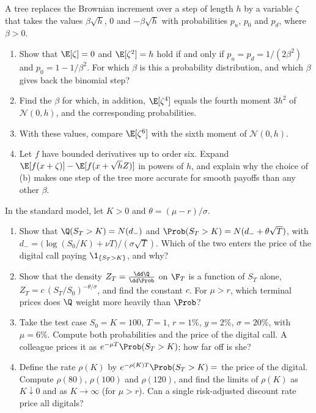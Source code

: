 
\begin{exercise}\label{ex:sm-trinomial}
\easy A tree replaces the Brownian increment over a step of length $h$ by a variable $\zeta$ that
takes the values $\beta\sqrt h$, $0$ and $-\beta\sqrt h$ with probabilities $p_u$, $p_0$ and $p_d$,
where $\beta>0$.
\begin{enumerate}[label=(\alph*)]
  \item Show that $\E[\zeta]=0$ and $\E[\zeta^2]=h$ hold if and only if $p_u=p_d=1/(2\beta^2)$ and
    $p_0=1-1/\beta^2$. For which $\beta$ is this a probability distribution, and which $\beta$
    gives back the binomial step?
  \item Find the $\beta$ for which, in addition, $\E[\zeta^4]$ equals the fourth moment $3h^2$ of
    $\mathcal N(0,h)$, and the corresponding probabilities.
  \item With these values, compare $\E[\zeta^6]$ with the sixth moment of $\mathcal N(0,h)$.
  \item Let $f$ have bounded derivatives up to order six. Expand $\E[f(x+\zeta)]-\E[f(x+\sqrt hZ)]$
    in powers of $h$, and explain why the choice of (b) makes one step of the tree more accurate
    for smooth payoffs than any other $\beta$.
\end{enumerate}
\end{exercise}

\begin{exercise}\label{ex:sm-two-measures}
\easy In the standard model, let $K>0$ and $\theta=(\mu-r)/\sigma$.
\begin{enumerate}[label=(\alph*)]
  \item Show that $\Q(S_T>K)=N(d_-)$ and $\Prob(S_T>K)=N(d_-+\theta\sqrt T)$, with
    $d_-=\big(\log(S_0/K)+\nu T\big)/(\sigma\sqrt T)$. Which of the two enters the price of the
    digital call paying $\1_{\{S_T>K\}}$, and why?
  \item Show that the density $Z_T=\frac{\dd\Q}{\dd\Prob}$ on $\F_T$ is a function of $S_T$ alone,
    $Z_T=c\,(S_T/S_0)^{-\theta/\sigma}$, and find the constant $c$. For $\mu>r$, which terminal
    prices does $\Q$ weight more heavily than $\Prob$?
  \item Take the test case $S_0=K=100$, $T=1$, $r=1\%$, $y=2\%$, $\sigma=20\%$, with $\mu=6\%$.
    Compute both probabilities and the price of the digital call. A colleague prices it as
    $e^{-\mu T}\Prob(S_T>K)$; how far off is she?
  \item Define the rate $\rho(K)$ by $e^{-\rho(K)T}\Prob(S_T>K)=$ the price of the digital. Compute
    $\rho(80)$, $\rho(100)$ and $\rho(120)$, and find the limits of $\rho(K)$ as $K\downarrow0$ and
    as $K\to\infty$ (for $\mu>r$). Can a single risk-adjusted discount rate price all digitals?
\end{enumerate}
\end{exercise}

